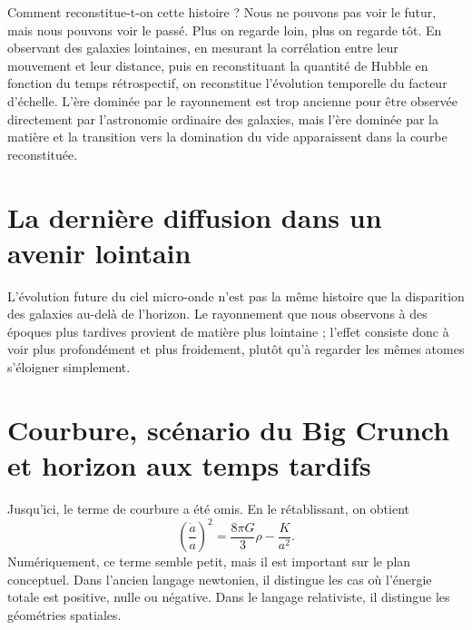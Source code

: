 Comment reconstitue-t-on cette histoire ? Nous ne pouvons pas voir le futur, mais nous pouvons voir le passé. Plus on regarde loin, plus on regarde tôt. En observant des galaxies lointaines, en mesurant la corrélation entre leur mouvement et leur distance, puis en reconstituant la quantité de Hubble en fonction du temps rétrospectif, on reconstitue l’évolution temporelle du facteur d’échelle. L’ère dominée par le rayonnement est trop ancienne pour être observée directement par l’astronomie ordinaire des galaxies, mais l’ère dominée par la matière et la transition vers la domination du vide apparaissent dans la courbe reconstituée.

\section{La dernière diffusion dans un avenir lointain}

L’évolution future du ciel micro-onde n’est pas la même histoire que la disparition des galaxies au-delà de l’horizon. Le rayonnement que nous observons à des époques plus tardives provient de matière plus lointaine ; l’effet consiste donc à voir plus profondément et plus froidement, plutôt qu’à regarder les mêmes atomes s’éloigner simplement.

\begin{classroomqa}\end{classroomqa}

\section{Courbure, scénario du Big Crunch et horizon aux temps tardifs}

Jusqu’ici, le terme de courbure a été omis. En le rétablissant, on obtient
\begin{equation}
\left(\frac{\dot a}{a}\right)^2
=
\frac{8\pi G}{3}\rho
-
\frac{K}{a^2}.
\end{equation}
Numériquement, ce terme semble petit, mais il est important sur le plan conceptuel. Dans l’ancien langage newtonien, il distingue les cas où l’énergie totale est positive, nulle ou négative. Dans le langage relativiste, il distingue les géométries spatiales.

